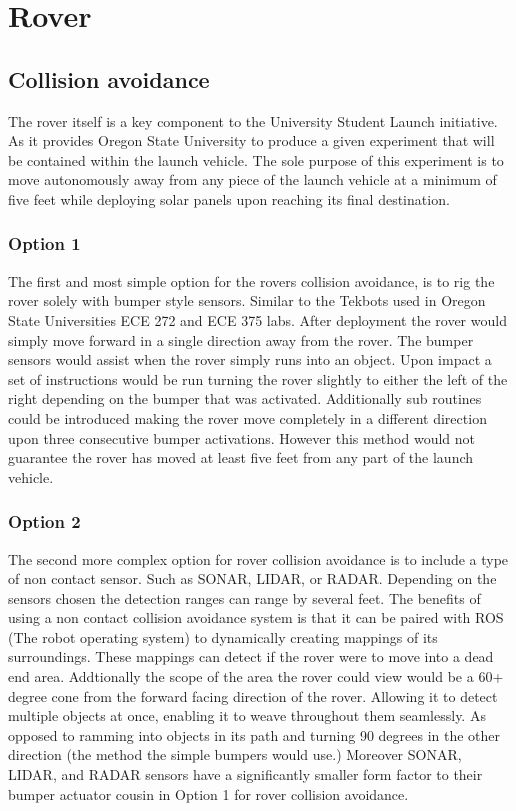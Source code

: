 \documentclass[onecolumn, draftclsnofoot,10pt, compsoc]{IEEEtran}
\begin{document}
\section{Rover}
\subsection{Collision avoidance}
The rover itself is a key component to the University Student Launch initiative. As it provides Oregon State University to produce a given experiment that will be contained within the launch vehicle. The sole purpose of this experiment is to move autonomously away from any piece of the launch vehicle at a minimum of five feet while deploying solar panels upon reaching its final destination.
\subsubsection{Option 1}
The first and most simple option for the rovers collision avoidance, is to rig the rover solely with bumper style sensors. Similar to the Tekbots used in Oregon State Universities ECE 272 and ECE 375 labs. After deployment the rover would simply move forward in a single direction away from the rover. The bumper sensors would assist when the rover simply runs into an object. Upon impact a set of instructions would be run turning the rover slightly to either the left of the right depending on the bumper that was activated. Additionally sub routines could be introduced making the rover move completely in a different direction upon three consecutive bumper activations. However this method would not guarantee the rover has moved at least five feet from any part of the launch vehicle.
\subsubsection{Option 2}
The second more complex option for rover collision avoidance is to include a type of non contact sensor. Such as SONAR, LIDAR, or RADAR. Depending on the sensors chosen the detection ranges can range by several feet. The benefits of using a non contact collision avoidance system is that it can be paired with ROS (The robot operating system) to dynamically creating mappings of its surroundings. These mappings can detect if the rover were to move into a dead end area. Addtionally the scope of the area the rover could view would be a 60+ degree cone from the forward facing direction of the rover. Allowing it to detect multiple objects at once, enabling it to weave throughout them seamlessly. As opposed to ramming into objects in its path and turning 90 degrees in the other direction (the method the simple bumpers would use.) Moreover SONAR, LIDAR, and RADAR sensors have a significantly smaller form factor to their bumper actuator cousin in Option 1 for rover collision avoidance.
\end{document}

